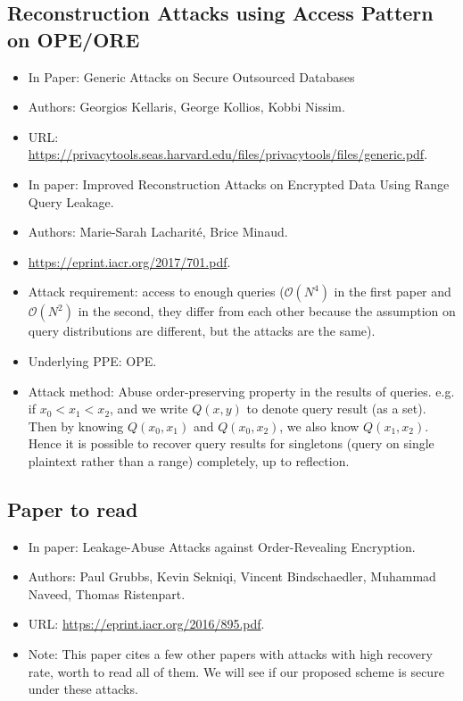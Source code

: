 \documentclass[12pt]{article}
\begin{document}
\subsection{Reconstruction Attacks using Access Pattern on OPE/ORE}
\begin{itemize}
	\item In Paper: Generic Attacks on Secure Outsourced Databases
	
	\item Authors: Georgios Kellaris, George Kollios, Kobbi Nissim.
	
	\item URL: \url{https://privacytools.seas.harvard.edu/files/privacytools/files/generic.pdf}.
	
	\item In paper: Improved Reconstruction Attacks on Encrypted Data Using Range Query Leakage.
	
	\item Authors: Marie-Sarah Lacharit\'{e}, Brice Minaud.
	
	\item \url{https://eprint.iacr.org/2017/701.pdf}.
	
	\item Attack requirement: access to enough queries ($\mathcal{O}(N^4)$ in the first paper and $\mathcal{O}(N^2)$ in the second, they differ from each other because the assumption on query distributions are different, but the attacks are the same).
	
	\item Underlying PPE: OPE.
	
	\item Attack method: Abuse order-preserving property in the results of queries. e.g. if $x_0 < x_1 < x_2$, and we write $Q(x,y)$ to denote query result (as a set). Then by knowing $Q(x_0,x_1)$ and $Q(x_0,x_2)$, we also know $Q(x_1,x_2)$. Hence it is possible to recover query results for singletons (query on single plaintext rather than a range) completely, up to reflection.
\end{itemize}

\subsection{Paper to read}
\begin{itemize}
	\item In paper: Leakage-Abuse Attacks against Order-Revealing Encryption.
	
	\item Authors: Paul Grubbs, Kevin Sekniqi, Vincent Bindschaedler, Muhammad Naveed, Thomas Ristenpart.
	
	\item URL: \url{https://eprint.iacr.org/2016/895.pdf}.
	
	\item Note: This paper cites a few other papers with attacks with high recovery rate, worth to read all of them. We will see if our proposed scheme is secure under these attacks.
\end{itemize}
\end{document}
